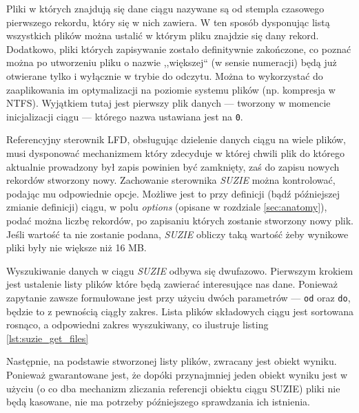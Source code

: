 \documentclass[a4paper,polish,12pt,twoside]{article}
\newcommand{\WorkLineSpread}{1.5}
\begin{document}
Pliki w których znajdują się dane ciągu nazywane są od stempla czasowego pierwszego rekordu, który się w nich zawiera. W ten sposób dysponując listą wszystkich plików można ustalić w którym pliku znajdzie się dany rekord. Dodatkowo, pliki których zapisywanie zostało definitywnie zakończone, co poznać można po utworzeniu pliku o nazwie ,,większej`` (w sensie numeracji) będą już otwierane tylko i wyłącznie w trybie do odczytu. Można to wykorzystać do zaaplikowania im optymalizacji na poziomie systemu plików (np. kompresja w NTFS). Wyjątkiem tutaj jest pierwszy plik danych --- tworzony w momencie inicjalizacji ciągu --- którego nazwa ustawiana jest na \texttt{0}.

Referencyjny sterownik LFD, obsługując dzielenie danych ciągu na wiele plików, musi dysponować mechanizmem który zdecyduje w której chwili plik do którego aktualnie prowadzony był zapis powinien być zamknięty, zaś do zapisu nowych rekordów stworzony nowy. Zachowanie sterownika \textit{SUZIE} można kontrolować, podając mu odpowiednie opcje. Możliwe jest to przy definicji (bądź późniejszej zmianie definicji) ciągu, w polu \textit{options} (opisane w rozdziale \ref{sec:anatomy}), podać można liczbę rekordów, po zapisaniu których zostanie stworzony nowy plik. Jeśli wartość ta nie zostanie podana, \textit{SUZIE} obliczy taką wartość żeby wynikowe pliki były nie większe niż 16 MB.

Wyszukiwanie danych w ciągu \textit{SUZIE} odbywa się dwufazowo. Pierwszym krokiem jest ustalenie listy plików które będą zawierać interesujące nas dane. Ponieważ zapytanie zawsze formułowane jest przy użyciu dwóch parametrów --- \texttt{od} oraz \texttt{do}, będzie to z pewnością ciągły zakres. Lista plików składowych ciągu jest sortowana rosnąco, a odpowiedni zakres wyszukiwany, co ilustruje listing \ref{lst:suzie_get_files}

\begin{listing}
\linespread{1} \small  \linespread{\WorkLineSpread} \normalsize
\end{listing}

Następnie, na podstawie stworzonej listy plików, zwracany jest obiekt wyniku. Ponieważ gwarantowane jest, że dopóki przynajmniej jeden obiekt wyniku jest w użyciu (o co dba mechanizm zliczania referencji obiektu ciągu SUZIE) pliki nie będą kasowane, nie ma potrzeby późniejszego sprawdzania ich istnienia.
\end{document}

